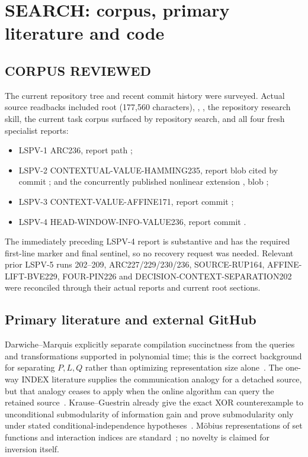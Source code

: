 \documentclass[11pt]{article}
\begin{document}
\section{SEARCH: corpus, primary literature and code}
\subsection*{CORPUS REVIEWED}
The current repository tree and recent commit history were surveyed.  Actual
source readbacks included root  (177,560 characters),
, , the repository research skill, the current
task corpus surfaced by repository search, and all four fresh specialist
reports:
\begin{itemize}
\item LSPV-1 ARC236, report path
;
\item LSPV-2 CONTEXTUAL-VALUE-HAMMING235, report blob cited by commit
;
and the concurrently published nonlinear extension
,
blob ;
\item LSPV-3 CONTEXT-VALUE-AFFINE171, report commit
;
\item LSPV-4 HEAD-WINDOW-INFO-VALUE236, report commit
.
\end{itemize}
The immediately preceding LSPV-4 report is substantive and has the required
first-line marker and final sentinel, so no recovery request was needed.
Relevant prior LSPV-5 runs 202--209, ARC227/229/230/236, SOURCE-RUP164,
AFFINE-LIFT-BVE229, FOUR-PIN226 and DECISION-CONTEXT-SEPARATION202 were
reconciled through their actual reports and current root sections.

\subsection*{Primary literature and external GitHub}
Darwiche--Marquis explicitly separate compilation succinctness from the
queries and transformations supported in polynomial time; this is the correct
background for separating $P,L,Q$ rather than optimizing representation size
alone~\cite{dm}.  The one-way INDEX literature supplies the communication
analogy for a detached source, but that analogy ceases to apply when the online
algorithm can query the retained source~\cite{knr}.  Krause--Guestrin already
give the exact XOR counterexample to unconditional submodularity of information
gain and prove submodularity only under stated conditional-independence
hypotheses~\cite{kg}.  M\"obius representations of set functions and interaction
indices are standard~\cite{gmr}; no novelty is claimed for inversion itself.
\end{document}
